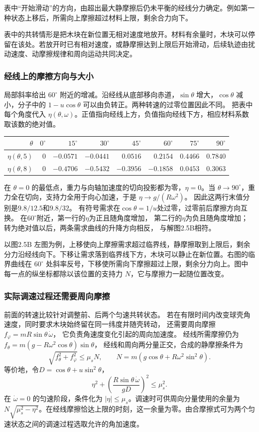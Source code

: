 \documentclass[UTF8,fontset=fandol,a4paper,11pt]{ctexart}
\begin{document}
表中“开始滑动”的方向，由超出最大静摩擦后仍未平衡的经线分力确定。例如第一种状态上移后，所需向上摩擦超过材料上限，剩余合力向下。

表中的共转情形是把木块在新位置无相对速度地放开。材料有余量时，木块可以停留在该处。若放开时已有相对速度，或静摩擦达到上限后开始滑动，后续轨迹由扰动速度、动摩擦规律和周向运动共同决定。
\subsubsection*{经线上的摩擦方向与大小}
局部斜率给出 $60^\circ$ 附近的增减。沿经线从底部移向赤道，$\sin\theta$ 增大，$\cos\theta$ 减小，分子中的 $1-u\cos\theta$ 可以由负转正。两种转速的过零位置因此不同。
把表中每个角度代入 $\eta(\theta,\omega)$。正值指向经线上方，负值指向经线下方，相应材料系数取该数的绝对值。
\begin{center}
\begin{tabular}{@{}rrrrrrrr@{}}\toprule
$\theta$ & $0^\circ$ & $15^\circ$ & $30^\circ$ & $45^\circ$ & $60^\circ$ & $75^\circ$ & $90^\circ$\\\midrule
$\eta(\theta,5)$ & 0 & $-0.0571$ & $-0.0441$ & $0.0516$ & $0.2154$ & $0.4466$ & $0.7840$\\
$\eta(\theta,8)$ & 0 & $-0.4706$ & $-0.5432$ & $-0.3956$ & $-0.1858$ & $0.0453$ & $0.3063$\\\bottomrule
\end{tabular}
\end{center}
在 $\theta=0$ 的最低点，重力与向轴加速度的切向投影都为零，$\eta=0$。当 $\theta\to90^\circ$，重力全在切向，支持力全用于向心加速，于是 $\eta\to g/(R\omega^2)$。
因此这两行末值分别是$9.8/12.5$和$9.8/32$。
有符号需求在$\cos\theta=1/u$处过零，过零前后摩擦方向互换。
在$60^\circ$附近，第一行的$\eta$为正且随角度增加，
第二行的$\eta$为负且随角度增加；转为绝对值以后，两条需求曲线的升降方向相反，
与解图2.5B相符。

以图2.5B 左图为例，上移使向上摩擦需求超过临界线，静摩擦取到上限后，剩余分力沿经线向下。下移让需求落到临界线下方，木块可以静止在新位置。右图的临界曲线在 $60^\circ$ 处斜率反号，下移使所需向下摩擦超过上限，剩余分力向上。图中每一点的纵坐标都除以该位置的支持力 $N$，它与摩擦力一起随位置改变。

\subsubsection*{实际调速过程还需要周向摩擦}
前面的转速比较针对调整前、后两个匀速共转状态。
若在有限时间内改变球壳角速度，同时要求木块始终留在同一纬度并随壳转动，
还需要周向摩擦$f_\varphi=mR\sin\theta\,\dot\omega$，
它负责角速度变化引起的周向加速度。
经线所需摩擦仍为$f_\theta=m(g-R\omega^2\cos\theta)\sin\theta$，
经线和周向两分量正交，合成的静摩擦条件为
\[
\sqrt{f_\theta^2+f_\varphi^2}\leq\mu_sN,
\qquad N=m(g\cos\theta+R\omega^2\sin^2\theta).
\]
等价地，令$D=\cos\theta+u\sin^2\theta$，
\[
\eta^2+
\left(\frac{R\sin\theta\,\dot\omega}{gD}\right)^2
\leq\mu_s^2.
\]
在 $\dot\omega=0$ 的匀速阶段，条件化为 $|\eta|\leq\mu_s$。调速时可供周向分量使用的余量为 $N\sqrt{\mu_s^2-\eta^2}$。在经线摩擦恰达上限的时刻，这一余量为零。由合摩擦式可为两个匀速状态之间的调速过程选取允许的角加速度。
\end{document}
